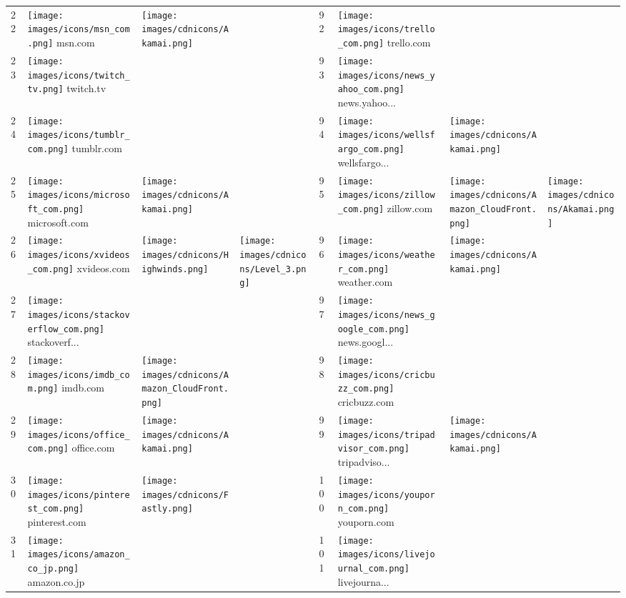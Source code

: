 \begin{table}[tbp]
\begin{tabular}{|llll|llll|}
22 & \texttt{[image: images/icons/msn\_com.png]} msn.com & \texttt{[image: images/cdnicons/Akamai.png]} & & 92 & \texttt{[image: images/icons/trello\_com.png]} trello.com & & \\
23 & \texttt{[image: images/icons/twitch\_tv.png]} twitch.tv & & & 93 & \texttt{[image: images/icons/news\_yahoo\_com.png]} news.yahoo... & & \\
24 & \texttt{[image: images/icons/tumblr\_com.png]} tumblr.com & & & 94 & \texttt{[image: images/icons/wellsfargo\_com.png]} wellsfargo... & \texttt{[image: images/cdnicons/Akamai.png]} & \\
25 & \texttt{[image: images/icons/microsoft\_com.png]} microsoft.com & \texttt{[image: images/cdnicons/Akamai.png]} & & 95 & \texttt{[image: images/icons/zillow\_com.png]} zillow.com & \texttt{[image: images/cdnicons/Amazon\_CloudFront.png]} & \texttt{[image: images/cdnicons/Akamai.png]} \\
26 & \texttt{[image: images/icons/xvideos\_com.png]} xvideos.com & \texttt{[image: images/cdnicons/Highwinds.png]} & \texttt{[image: images/cdnicons/Level\_3.png]} & 96 & \texttt{[image: images/icons/weather\_com.png]} weather.com & \texttt{[image: images/cdnicons/Akamai.png]} & \\
27 & \texttt{[image: images/icons/stackoverflow\_com.png]} stackoverf... & & & 97 & \texttt{[image: images/icons/news\_google\_com.png]} news.googl... & & \\
28 & \texttt{[image: images/icons/imdb\_com.png]} imdb.com & \texttt{[image: images/cdnicons/Amazon\_CloudFront.png]} & & 98 & \texttt{[image: images/icons/cricbuzz\_com.png]} cricbuzz.com & & \\
29 & \texttt{[image: images/icons/office\_com.png]} office.com & \texttt{[image: images/cdnicons/Akamai.png]} & & 99 & \texttt{[image: images/icons/tripadvisor\_com.png]} tripadviso... & \texttt{[image: images/cdnicons/Akamai.png]} & \\
30 & \texttt{[image: images/icons/pinterest\_com.png]} pinterest.com & \texttt{[image: images/cdnicons/Fastly.png]} & & 100 & \texttt{[image: images/icons/youporn\_com.png]} youporn.com & & \\
31 & \texttt{[image: images/icons/amazon\_co\_jp.png]} amazon.co.jp & & & 101 & \texttt{[image: images/icons/livejournal\_com.png]} livejourna... & & \\

\end{tabular}
\end{table}
